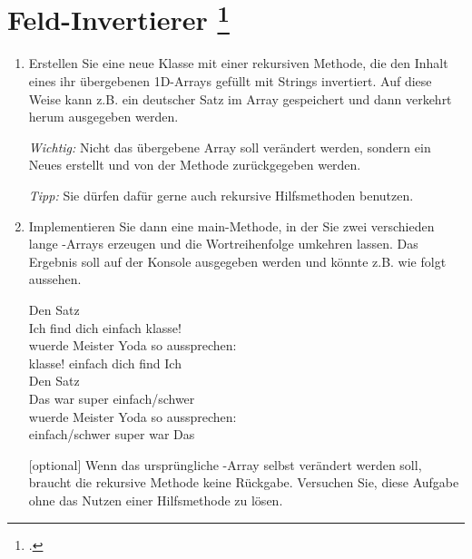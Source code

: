 \documentclass{lehramt-informatik-aufgabe}
\begin{document}

\section{Feld-Invertierer
\footcite[Aufgabe 1: Arrays und Rekursion, Diese Aufgabe stammt
aus der Vorlesung Konzepte der Programmierung von Prof. Bernhard
Westfechtel der Universität Bayreuth, WS 2017/18, Übungsblatt 8 und
wurde dankenswerterweise zur Verwendung in diesem Aufgabenblatt zur
Verfügung gestellt.]{aud:ab:2}}

\begin{enumerate}

%

\item Erstellen Sie eine neue Klasse  mit einer
rekursiven Methode, die den Inhalt eines ihr übergebenen 1D-Arrays
gefüllt mit Strings invertiert. Auf diese Weise kann z.B. ein deutscher
Satz im Array gespeichert und dann verkehrt herum ausgegeben werden.

\emph{Wichtig:} Nicht das übergebene Array soll verändert werden,
sondern ein Neues erstellt und von der Methode zurückgegeben werden.

\emph{Tipp:} Sie dürfen dafür gerne auch rekursive Hilfsmethoden
benutzen.

%

\item Implementieren Sie dann eine main-Methode, in der Sie zwei
verschieden lange -Arrays erzeugen und die Wortreihenfolge
umkehren lassen. Das Ergebnis soll auf der Konsole ausgegeben werden
und könnte z.B. wie folgt aussehen.

\bigskip

{
\ttfamily
Den Satz\\
Ich find dich einfach klasse!\\
wuerde Meister Yoda so aussprechen:\\
klasse! einfach dich find Ich\\

Den Satz\\
Das war super einfach/schwer\\
wuerde Meister Yoda so aussprechen:\\
einfach/schwer super war Das
}

\bigskip

[optional] Wenn das ursprüngliche -Array selbst verändert
werden soll, braucht die rekursive Methode keine Rückgabe. Versuchen
Sie, diese Aufgabe ohne das Nutzen einer Hilfsmethode zu lösen.

\begin{antwort}
\end{antwort}
\end{enumerate}
\end{document}
